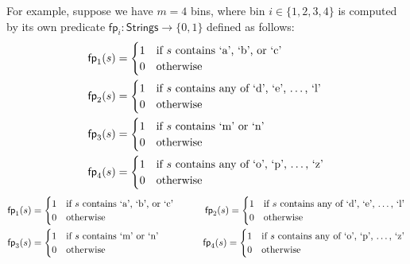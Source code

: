 For example, suppose we have $m=4$ bins, where bin $i\in\{1,2,3,4\}$ is computed by its own predicate $\mathsf{fp}_i: \mathsf{Strings} \to \{0,1\}$ defined as follows:
\ifsp
\begin{align*}
 \mathsf{fp}_1(s) &= \begin{cases}
  1 & \text{if $s$ contains `a', `b', or `c'}\\
  0 & \text{otherwise}
 \end{cases}\\
 \mathsf{fp}_2(s) &= \begin{cases}
  1 & \text{if $s$ contains any of `d', `e', \dots, `l'}\\
  0 & \text{otherwise}
 \end{cases}\\
 \mathsf{fp}_3(s) &= \begin{cases}
  1 & \text{if $s$ contains `m' or `n'}\\
  0 & \text{otherwise}
 \end{cases}\\
 \mathsf{fp}_4(s) &= \begin{cases}
  1 & \text{if $s$ contains any of `o', `p', \dots, `z'}\\
  0 & \text{otherwise}
 \end{cases}
\end{align*}
\else
\begin{align*}
 &\mathsf{fp}_1(s) = \begin{cases}
  1 & \text{if $s$ contains `a', `b', or `c'}\\
  0 & \text{otherwise}
 \end{cases}
 \qquad
 &\mathsf{fp}_2(s) = \begin{cases}
  1 & \text{if $s$ contains any of `d', `e', \dots, `l'}\\
  0 & \text{otherwise}
 \end{cases}
 \\
 &\mathsf{fp}_3(s) = \begin{cases}
  1 & \text{if $s$ contains `m' or `n'}\\
  0 & \text{otherwise}
 \end{cases}
 \qquad
 &\mathsf{fp}_4(s) = \begin{cases}
  1 & \text{if $s$ contains any of `o', `p', \dots, `z'}\\
  0 & \text{otherwise}
 \end{cases}
\end{align*}
\fi

